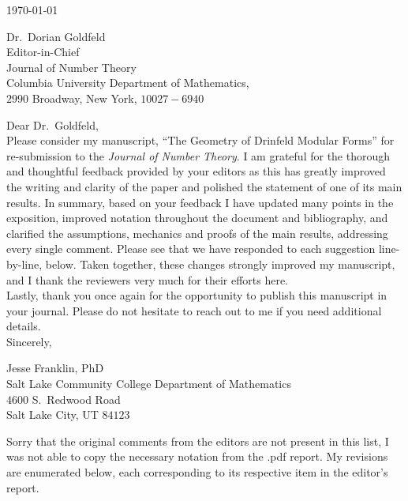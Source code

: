 \documentclass[12pt]{article}
\begin{document}
	
	\noindent
	\today
	
	\vspace{12pt}
	\noindent
	Dr.\ Dorian Goldfeld\\
	Editor-in-Chief\\
	Journal of Number Theory\\
	Columbia University Department of Mathematics,\\
	$2990$ Broadway, New York, $10027-6940$\\
	\vspace{24pt}
	
	\noindent
	Dear Dr.\ Goldfeld,\\
	
	Please consider my manuscript, ``The Geometry of Drinfeld Modular Forms'' for re-submission to the \textit{Journal of Number Theory}. I am grateful for the thorough and thoughtful feedback provided by your editors as this has greatly improved the writing and clarity of the paper and polished the statement of one of its main results. In summary, based on your feedback I have updated many points in the exposition, improved notation throughout the document and bibliography, and clarified the assumptions, mechanics and proofs of the main results, addressing every single comment. Please see that we have responded to each suggestion line-by-line, below. Taken together, these changes strongly improved my
	manuscript, and I thank the reviewers very much for their efforts here.\\
	
	Lastly, thank you once again for the opportunity to publish this manuscript in your journal.
	Please do not hesitate to reach out to me if you need additional details.\\
	
	\noindent
	Sincerely,
	
	\vspace{12pt}
	\noindent
	Jesse Franklin, PhD\\
	Salt Lake Community College
	Department of Mathematics\\
	$4600$ S.\ Redwood Road\\
	Salt Lake City, UT $84123$
	
	\newpage
	
	Sorry that the original comments from the editors are not present in this list, I was not able to copy the necessary notation from the .pdf report. My revisions are enumerated below, each corresponding to its respective item in the editor's report. 
	
\end{document}
